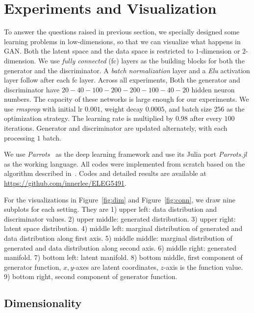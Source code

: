 \section{Experiments and Visualization} \label{sec:exp}

To answer the questions raised in previous section,
we specially designed some learning problems in low-dimensions,
so that we can visualize what happens in GAN.
Both the latent space and the data space is
restricted to $1$-dimension or $2$-dimension.
We use \emph{fully connected} (fc) layers as the building blocks for both
the generator and the discriminator.
A \emph{batch normalization} layer and a \emph{Elu} activation layer
follow after each fc layer.
Across all experiments,
Both the generator and discriminator have
$20-40-100-200-200-100-40-20$ hidden neuron numbers.
The capacity of these networks is large enough for our experiments.
We use \emph{rmsprop} with initial lr $0.001$,
weight decay $0.0005$, and batch size $256$
as the optimization strategy.
The learning rate is multiplied by $0.98$ after every $100$ iterations.
Generator and discriminator are updated alternately,
with each processing $1$ batch.

We use \emph{Parrots}~\cite{parrots} as the deep learning framework
and use its Julia port \emph{Parrots.jl}~\cite{parrotsjl}
as the working language.
All codes were implemented from scratch based on
the algorithm described in~\cite{goodfellow2014generative}.
Codes and detailed results are available at
\url{https://github.com/innerlee/ELEG5491}.

For the visualizations in Figure~\ref{fig:dim} and Figure~\ref{fig:conn},
we draw nine subplots for each setting.
They are
1) upper left: data distribution and discriminator values.
2) upper middle: generated distribution.
3) upper right: latent space distribution.
4) middle left: marginal distribution of generated and
data distribution along first axis.
5) middle middle: marginal distribution of generated and
data distribution along second axis.
6) middle right: generated manifold.
7) bottom left: latent manifold.
8) bottom middle, first component of generator function,
$x,y$-axes are latent coordinates,
$z$-axis is the function value.
9) bottom right, second component of generator function.

\subsection{Dimensionality}

